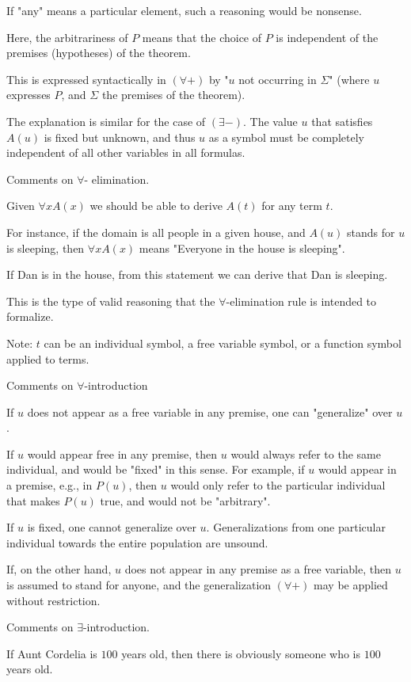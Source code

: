 \documentclass{article}
\begin{document}
If "any" means a particular element, such a reasoning would be nonsense. 

Here, the arbitrariness of $P$ means that the choice of $P$ is independent of the premises (hypotheses) of the theorem.

This is expressed syntactically in $(\forall +)$ by "$u$ not occurring in $\Sigma$" (where $u$ expresses $P$, and $\Sigma$ the premises of the theorem).

The explanation is similar for the case of $(\exists -)$. The value $u$ that satisfies $A(u)$ is fixed but unknown, and thus $u$ as a symbol must be completely independent of all other variables in all formulas.

Comments on $\forall$- elimination. 

Given $\forall x A(x)$ we should be able to derive $A(t)$ for any term $t$.

For instance, if the domain is all people in a given house, and $A(u)$ stands for $u$ is sleeping, then $\forall x A(x)$ means "Everyone in the house is sleeping".

If Dan is in the house, from this statement we can derive that Dan is sleeping.

This is the type of valid reasoning that the $\forall$-elimination rule is intended to formalize.

Note: $t$ can be an individual symbol, a free variable symbol, or a function symbol applied to terms.


Comments on $\forall$-introduction

If $u$ does not appear as a free variable in any premise, one can "generalize" over $u$.

If $u$ would appear free in any premise, then $u$ would always refer to the same individual, and would be "fixed" in this sense. For example, if $u$ would appear in a premise, e.g., in $P(u)$, then $u$ would only refer to the particular individual that makes $P(u)$ true, and would not be "arbitrary".

If $u$ is fixed, one cannot generalize over $u$. Generalizations from one particular individual towards the entire population are unsound.

If, on the other hand, $u$ does not appear in any premise as a free variable, then $u$ is assumed to stand for anyone, and the generalization $(\forall +)$ may be applied without restriction.

Comments on $\exists$-introduction.

If Aunt Cordelia is $100$ years old, then there is obviously someone who is $100$ years old.
\end{document}
